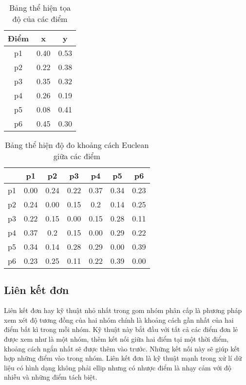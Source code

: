 \begin{table}[h!]
\centering
\caption{Bảng thể hiện tọa độ của các điểm}
\label{tab:2_1}
\begin{tabular}{|c|c|c|}
\hline
Điểm & x & y \\ \hline
p1    & 0.40         & 0.53         \\ \hline
p2    & 0.22         & 0.38         \\ \hline
p3    & 0.35         & 0.32         \\ \hline
p4    & 0.26         & 0.19         \\ \hline
p5    & 0.08         & 0.41         \\ \hline
p6    & 0.45         & 0.30         \\ \hline
\end{tabular}
\end{table}

\begin{table}[h!]
\centering
\caption{Bảng thể hiện độ đo khoảng cách Euclean giữa các điểm}
\label{tab:2_2}
\begin{tabular}{|c|c|c|c|c|c|c|}
\hline
   & p1   & p2   & p3   & p4   & p5   & p6   \\ \hline
p1 & 0.00 & 0.24 & 0.22 & 0.37 & 0.34 & 0.23 \\ \hline
p2 & 0.24 & 0.00 & 0.15 & 0.2  & 0.14 & 0.25 \\ \hline
p3 & 0.22 & 0.15 & 0.00 & 0.15 & 0.28 & 0.11 \\ \hline
p4 & 0.37 & 0.2  & 0.15 & 0.00 & 0.29 & 0.22 \\ \hline
p5 & 0.34 & 0.14 & 0.28 & 0.29 & 0.00 & 0.39 \\ \hline
p6 & 0.23 & 0.25 & 0.11 & 0.22 & 0.39 & 0.00 \\ \hline
\end{tabular}%
\end{table}

\subsection{Liên kết đơn}	
\label{sec:lkd}	
Liên kết đơn hay kỹ thuật nhỏ nhất trong gom nhóm phân cấp là phương pháp xem xét độ tương đồng của hai nhóm chính là khoảng cách gần nhất của hai điểm bất kì trong mỗi nhóm. 
Kỹ thuật này bắt đầu với tất cả các điểm đơn lẻ được xem như là một nhóm, thêm kết nối giữa hai điểm tại một thời điểm, khoảng cách ngắn nhất sẽ được thêm vào trước.
Những kết nối này sẽ giúp kết hợp những điểm vào trong nhóm.
Liên kết đơn là kỹ thuật mạnh trong xử lí dữ liệu có hình dạng không phải ellip nhưng có nhược điểm là nhạy cảm với độ nhiễu và những điểm tách biệt.

